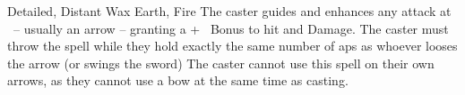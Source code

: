   {Detailed, Distant}%
  {Wax}%
  {Earth, Fire}%
  {}%
  {The caster guides and enhances any attack at \spellRange\ -- usually an arrow -- granting a +~ Bonus to hit and Damage.
    The caster must throw the spell while they hold exactly the same number of \glspl{ap} as whoever looses the arrow (or swings the sword)}%
  {The caster cannot use this spell on their own arrows, as they cannot use a bow at the same time as casting.}
